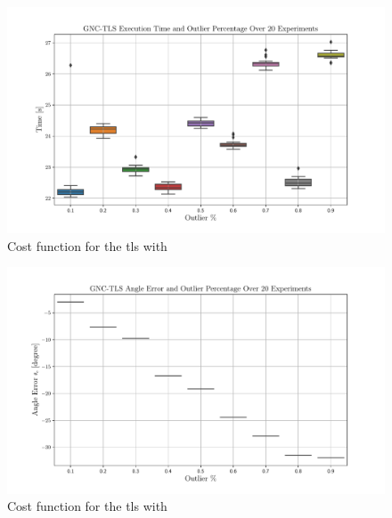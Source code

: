 \begin{figure}[!h]
	\begin{center}
		\includegraphics[width=\textwidth]{chapters/2-pose-estimation/fig/GNC-TLS-time-e.pdf}
	\end{center}
	\caption{Cost function for the \gls{tls} with }
	\label{fig:GNC-TLS-time-e}
\end{figure}

\begin{figure}[!h]
	\begin{center}
		\includegraphics[width=\textwidth]{chapters/2-pose-estimation/fig/GNC-TLS-theta-e.pdf}
	\end{center}
	\caption{Cost function for the \gls{tls} with }
	\label{fig:GNC-TLS-theta-e}
\end{figure}

